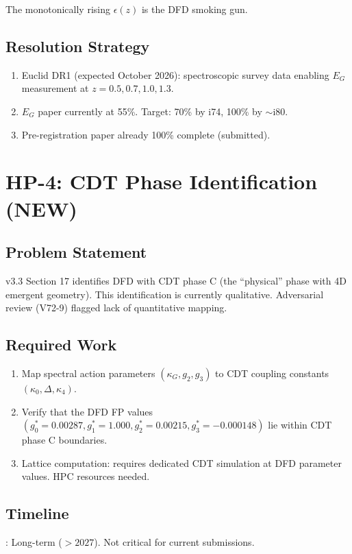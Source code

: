 \documentclass[11pt,a4paper]{article}
\begin{document}
The monotonically rising $\epsilon(z)$ is the DFD smoking gun.

\subsection{Resolution Strategy}
\begin{enumerate}[nosep]
\item Euclid DR1 (expected October 2026): spectroscopic survey data enabling $E_G$ measurement at $z = 0.5, 0.7, 1.0, 1.3$.
\item $E_G$ paper currently at 55\%. Target: 70\% by i74, 100\% by $\sim$i80.
\item Pre-registration paper already 100\% complete (submitted).
\end{enumerate}

\section{HP-4: CDT Phase Identification (NEW)}

\subsection{Problem Statement}
v3.3 Section 17 identifies DFD with CDT phase C (the ``physical'' phase with 4D emergent geometry). This identification is currently qualitative. Adversarial review (V72-9) flagged lack of quantitative mapping.

\subsection{Required Work}
\begin{enumerate}[nosep]
\item Map spectral action parameters $(\kappa_G, g_2, g_3)$ to CDT coupling constants $(\kappa_0, \Delta, \kappa_4)$.
\item Verify that the DFD FP values $(g_0^* = 0.00287, g_1^* = 1.000, g_2^* = 0.00215, g_3^* = -0.000148)$ lie within CDT phase C boundaries.
\item Lattice computation: requires dedicated CDT simulation at DFD parameter values. HPC resources needed.
\end{enumerate}

\subsection{Timeline}: Long-term ($> 2027$). Not critical for current submissions.
\end{document}
